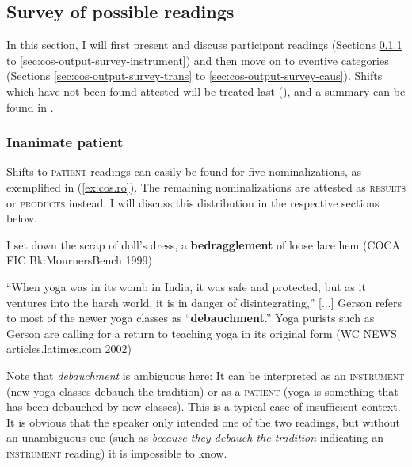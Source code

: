 \subsection{Survey of possible readings}
\label{sec:cos-output-survey}

In this section, I will first present and discuss participant readings (Sections \ref{sec:cos-output-survey-pat} to \ref{sec:cos-output-survey-instrument}) and then move on to eventive categories (Sections \ref{sec:cos-output-survey-trans} to \ref{sec:cos-output-survey-caus}). Shifts which have not been found attested will be treated last (), and a summary can be found in .

\subsubsection{{Inanimate patient}}
\label{sec:cos-output-survey-pat}

Shifts to \textsc{patient} readings can easily be found for five nominalizations, as exemplified in (\ref{ex:cos.ro}). The remaining nominalizations are attested as \textsc{results} or \textsc{products} instead. I will discuss this distribution in the respective sections below. 

\begin{exe}
  \ex \label{ex:cos.ro}
  \begin{xlist}
    \item \label{ex:cos.ro1} I set down the scrap of doll's dress, a \textbf{bedragglement} of loose lace hem {\small(\acs{COCA} FIC Bk:MournersBench 1999)}
    \item \label{ex:cos.ro2} ``When yoga was in its womb in India, it was safe and protected, but as it ventures into the harsh world, it is in danger of disintegrating,'' [...]  Gerson refers to most of the newer yoga classes as ``\textbf{debauchment}.'' Yoga purists such as Gerson are calling for a return to teaching yoga in its original form {\small(\acs{WC} NEWS articles.latimes.com 2002)}
  \end{xlist}
\end{exe}

\noindent Note that \textit{debauchment} is ambiguous here: It can be interpreted as an \textsc{instrument} (new yoga classes debauch the tradition) or as a \textsc{patient} (yoga is something that has been debauched by new classes).
This is a typical case of insufficient context. It is obvious that the speaker only intended one of the two readings, but without an unambiguous cue (such as \textit{because they debauch the tradition} indicating an \textsc{instrument} reading) it is impossible to know. 

